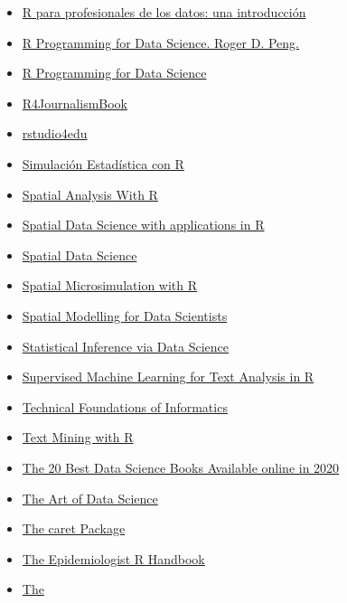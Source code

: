 \documentclass[
]{article}
\begin{document}
\begin{itemize}
\item
  \href{https://datanalytics.com/libro_r/}{R para profesionales de los
  datos: una introducción}
\item
  \href{https://leanpub.com/rprogramming}{R Programming for Data
  Science. Roger D. Peng.}
\item
  \href{https://www.cs.upc.edu/~robert/teaching/estadistica/rprogramming.pdf}{R
  Programming for Data Science}
\item
  \href{https://smach.github.io/R4JournalismBook/}{R4JournalismBook}
\item
  \href{https://rstudio4edu.github.io/rstudio4edu-book/}{rstudio4edu}
\item
  \href{https://rubenfcasal.github.io/simbook/}{Simulación Estadística
  con R}
\item
  \href{http://gis.humboldt.edu/OLM/r/Spatial\%20Analysis\%20With\%20R.pdf}{Spatial
  Analysis With R}
\item
  \href{https://r-spatial.org/book/}{Spatial Data Science with
  applications in R}
\item
  \href{https://keen-swartz-3146c4.netlify.app/}{Spatial Data Science}
\item
  \href{https://spatial-microsim-book.robinlovelace.net/index.html}{Spatial
  Microsimulation with R}
\item
  \href{https://gdsl-ul.github.io/san/}{Spatial Modelling for Data
  Scientists}
\item
  \href{https://moderndive.com/index.html}{Statistical Inference via
  Data Science}
\item
  \href{https://smltar.com/}{Supervised Machine Learning for Text
  Analysis in R}
\item
  \href{https://info201.github.io/}{Technical Foundations of
  Informatics}
\item
  \href{https://www.tidytextmining.com/}{Text Mining with R}
\item
  \href{https://www.ubuntupit.com/best-data-science-books-available-online/}{The
  20 Best Data Science Books Available online in 2020}
\item
  \href{https://bookdown.org/rdpeng/artofdatascience/}{The Art of Data
  Science}
\item
  \href{http://topepo.github.io/caret/index.html}{The caret Package}
\item
  \href{https://epirhandbook.com/en/}{The Epidemiologist R Handbook}
\item
  \href{https://www.cs.upc.edu/~robert/teaching/estadistica/TheRBook.pdf}{The
}
\end{itemize}
\end{document}

